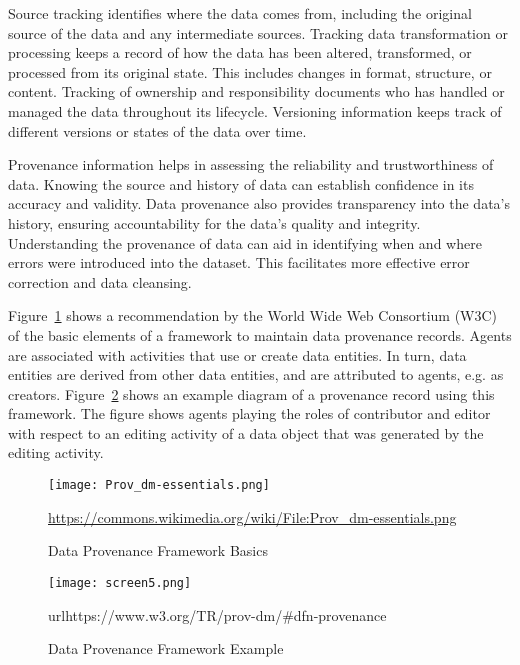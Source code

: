 Source tracking identifies where the data comes from, including the original source of the data and any intermediate sources. Tracking data transformation or processing keeps a record of how the data has been altered, transformed, or processed from its original state. This includes changes in format, structure, or content. Tracking of ownership and responsibility documents who has handled or managed the data throughout its lifecycle. Versioning information keeps track of different versions or states of the data over time.

Provenance information helps in assessing the reliability and trustworthiness of data. Knowing the source and history of data can establish confidence in its accuracy and validity. Data provenance also provides transparency into the data's history, ensuring accountability for the data's quality and integrity. Understanding the provenance of data can aid in identifying when and where errors were introduced into the dataset. This facilitates more effective error correction and data cleansing.

Figure~\ref{fig:provenancedm} shows a recommendation by the World Wide Web Consortium (W3C) of the basic elements of a framework to maintain data provenance records. Agents are associated with activities that use or create data entities. In turn, data entities are derived from other data entities, and are attributed to agents, e.g. as creators. Figure~\ref{fig:provenanceexample} shows an example diagram of a provenance record using this framework. The figure shows agents playing the roles of contributor and editor with respect to an editing activity of a data object that was generated by the editing activity. 

\begin{figure}[h]
\centering
\texttt{[image: Prov\_dm-essentials.png]}

\scriptsize{\url{https://commons.wikimedia.org/wiki/File:Prov_dm-essentials.png}}
\caption{Data Provenance Framework Basics}
\label{fig:provenancedm}
\end{figure}


\begin{figure}[h]
\centering
\texttt{[image: screen5.png]}

\scriptsize{url{https://www.w3.org/TR/prov-dm/\#dfn-provenance}}
\caption{Data Provenance Framework Example}
\label{fig:provenanceexample}
\end{figure}

